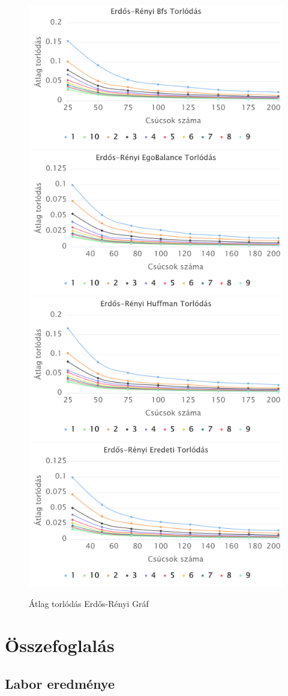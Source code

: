 \documentclass[12pt]{report}
\begin{document}
\begin{figure}[h]
	\begin{center}
		\includegraphics[width=0.49\linewidth]{pictures/erdos_con_bfs.png}
		\includegraphics[width=0.49\linewidth]{pictures/erdos_con_egobalance.png}
		\includegraphics[width=0.49\linewidth]{pictures/erdos_con_huffman.png}
		\includegraphics[width=0.49\linewidth]{pictures/erdos_con_original.png}
		\caption{Átlag torlódás Erdős-Rényi Gráf}
		\label{avg-con-erdos-renyi}
	\end{center}
\end{figure}



\chapter{Összefoglalás}

\section{Labor eredménye}
\end{document}
